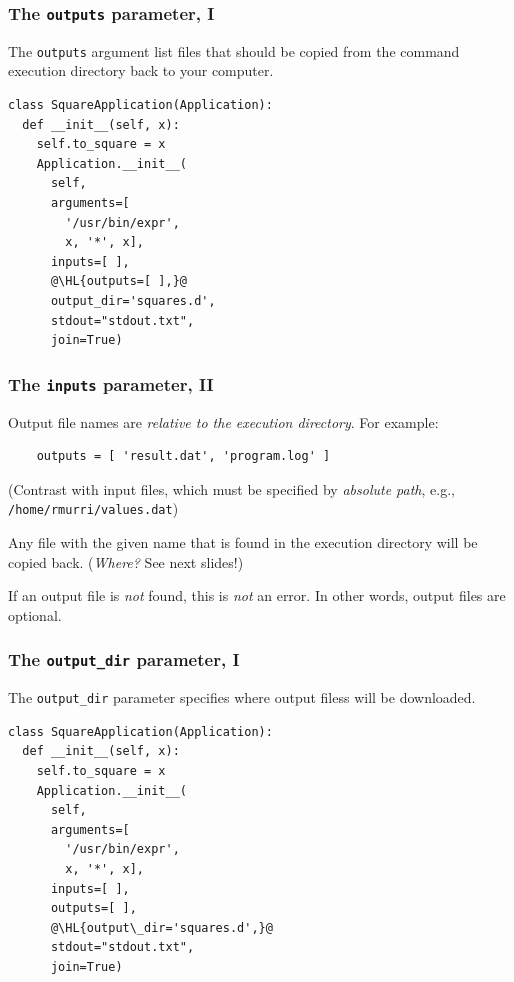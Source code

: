 \documentclass[english,serif,mathserif,xcolor=pdftex,dvipsnames,table]{beamer}
\begin{document}
\begin{frame}[fragile]
\frametitle{The \texttt{outputs} parameter, I}

The \texttt{outputs} argument list files that should be copied from
the command execution directory back to your computer.

  \+
\begin{lstlisting}
class SquareApplication(Application):
  def __init__(self, x):
    self.to_square = x
    Application.__init__(
      self,
      arguments=[
        '/usr/bin/expr',
        x, '*', x],
      inputs=[ ],
      @\HL{outputs=[ ],}@
      output_dir='squares.d',
      stdout="stdout.txt",
      join=True)
\end{lstlisting}
\end{frame}


\begin{frame}[fragile]
  \frametitle{The \texttt{inputs} parameter, II}

  Output file names are \emph{relative to the execution directory}.
  For example:
  \begin{lstlisting}
    outputs = [ 'result.dat', 'program.log' ]
  \end{lstlisting}

  \+
  (Contrast with input files, which must be specified by
  \emph{absolute path}, e.g., \texttt{/home/rmurri/values.dat})

  \+
  Any file with the given name that is found in the execution
  directory will be copied back. (\emph{Where?} See next slides!)

  \+
  If an output file is \emph{not} found, this is \emph{not} an
  error. In other words, output files are optional.

\end{frame}


\begin{frame}[fragile]
\frametitle{The \texttt{output\_dir} parameter, I}

The \lstinline|output_dir| parameter specifies where output filess
will be downloaded.

\+
\begin{lstlisting}
class SquareApplication(Application):
  def __init__(self, x):
    self.to_square = x
    Application.__init__(
      self,
      arguments=[
        '/usr/bin/expr',
        x, '*', x],
      inputs=[ ],
      outputs=[ ],
      @\HL{output\_dir='squares.d',}@
      stdout="stdout.txt",
      join=True)
\end{lstlisting}
\end{frame}
\end{document}
